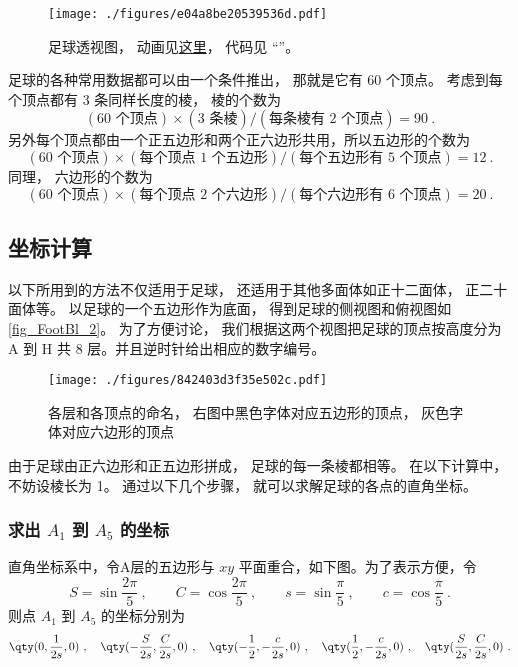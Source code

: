 


\begin{figure}[ht]
\centering
\texttt{[image: ./figures/e04a8be20539536d.pdf]}
\caption{足球透视图， 动画见\href{https://wuli.wiki/apps/football.html}{这里}， 代码见 “”。} \label{fig_FootBl_1}
\end{figure}

足球的各种常用数据都可以由一个条件推出， 那就是它有 60 个顶点。 考虑到每个顶点都有 3 条同样长度的棱， 棱的个数为
\begin{equation}
(\text{60 个顶点}) \times (\text{3 条棱}) / (\text{每条棱有 2 个顶点}) = 90~.
\end{equation}
另外每个顶点都由一个正五边形和两个正六边形共用，所以五边形的个数为
\begin{equation}
(\text{60 个顶点}) \times (\text{每个顶点 1 个五边形}) / (\text{每个五边形有 5 个顶点}) = 12~.
\end{equation}
同理， 六边形的个数为
\begin{equation}
(\text{60 个顶点}) \times (\text{每个顶点 2 个六边形}) / (\text{每个六边形有 6 个顶点}) = 20~.
\end{equation}


\subsection{坐标计算}
以下所用到的方法不仅适用于足球， 还适用于其他多面体如正十二面体， 正二十面体等。 以足球的一个五边形作为底面， 得到足球的侧视图和俯视图如\autoref{fig_FootBl_2}。 为了方便讨论， 我们根据这两个视图把足球的顶点按高度分为 A 到 H 共 8 层。并且逆时针给出相应的数字编号。

\begin{figure}[ht]
\centering
\texttt{[image: ./figures/842403d3f35e502c.pdf]}
\caption{各层和各顶点的命名， 右图中黑色字体对应五边形的顶点， 灰色字体对应六边形的顶点} \label{fig_FootBl_2}
\end{figure}

由于足球由正六边形和正五边形拼成， 足球的每一条棱都相等。 在以下计算中， 不妨设棱长为 1。 通过以下几个步骤， 就可以求解足球的各点的直角坐标。

\subsubsection{求出 $A_1$ 到 $A_5$ 的坐标}
直角坐标系中，令A层的五边形与 $xy$ 平面重合，如下图。为了表示方便，令
\begin{equation}
S = \sin\frac{2\pi}{5}~, \qquad
C = \cos\frac{2\pi}{5} ~,\qquad
s = \sin\frac{\pi}{5} ~,\qquad
c = \cos\frac{\pi}{5}~.
\end{equation}
则点 $A_1$ 到 $A_5$ 的坐标分别为
\begin{equation}\label{eq_FootBl_5}
\qty(0, \frac{1}{2s}, 0) ~,\quad
\qty(-\frac{S}{2s}, \frac{C}{2s}, 0) ~,\quad
\qty(-\frac12, -\frac{c}{2s}, 0)~, \quad
\qty(\frac12, -\frac{c}{2s}, 0) ~,\quad
\qty(\frac{S}{2s}, \frac{C}{2s}, 0)~.
\end{equation}

